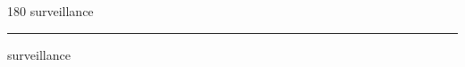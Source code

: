 
\begin{frame}
\begin{center}
\begin{turn}{180}
{\fontsize{2.5cm}{1em}\selectfont surveillance}
\end{turn}
\vspace{1em}\par  
\hrule
\vspace{1em}\par  
{\fontsize{2.5cm}{1em}\selectfont surveillance}
\end{center}
\end{frame}
